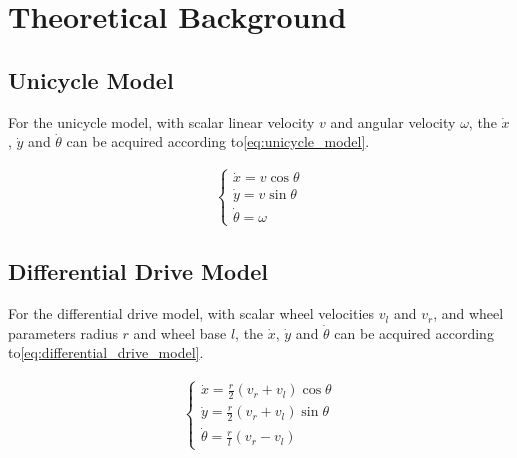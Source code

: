 \section{Theoretical Background}

\subsection{Unicycle Model}

For the unicycle model, with scalar linear velocity $v$ and angular velocity $\omega$, the $\dot{x}$, $\dot{y}$ and $\dot{\theta}$ can be acquired according to\:\eqref{eq:unicycle_model}\:\cite{carlenerikssonLectureKinematicsBehavioral2024}.

\begin{align}
    \label{eq:unicycle_model}
    \begin{cases}
    \dot{x} = v \cos{\theta} \\
    \dot{y} = v \sin{\theta} \\
    \dot{\theta} = \omega
    \end{cases}
\end{align}


\subsection{Differential Drive Model}

For the differential drive model, with scalar wheel velocities $v_l$ and $v_r$, and wheel parameters radius $r$ and wheel base $l$, the $\dot{x}$, $\dot{y}$ and $\dot{\theta}$ can be acquired according to\:\eqref{eq:differential_drive_model}\:\cite{carlenerikssonLectureKinematicsBehavioral2024}.

\begin{align}
    \label{eq:differential_drive_model}
    \begin{cases}
    \dot{x} = \frac{r}{2} (v_r + v_l) \cos{\theta} \\
    \dot{y} = \frac{r}{2} (v_r + v_l) \sin{\theta} \\
    \dot{\theta} = \frac{r}{l} (v_r - v_l)
    \end{cases}
\end{align}

